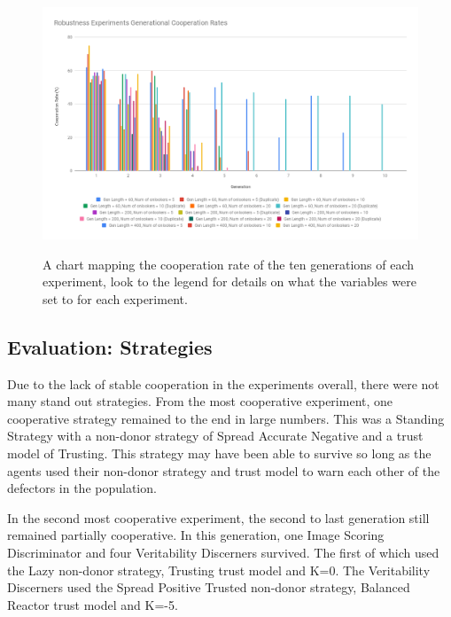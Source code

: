 \documentclass[]{final_report}
\begin{document}
\begin{figure}
\begin{framed}
	\includegraphics[width=\textwidth]{robustness_experiment1_chart.png}
	\label{fig:robustness_experiment_chart}
	\caption{A chart mapping the cooperation rate of the ten generations of each experiment, look to the legend for details on what the variables were set to for each experiment.}
\end{framed}
\end{figure}

\subsection{Evaluation: Strategies}
\label{subs:eval_strats}
Due to the lack of stable cooperation in the experiments overall, there were not many stand out strategies. From the most cooperative experiment, one cooperative strategy remained to the end in large numbers. This was a Standing Strategy with a non-donor strategy of Spread Accurate Negative and a trust model of Trusting. This strategy may have been able to survive so long as the agents used their non-donor strategy and trust model to warn each other of the defectors in the population.\par 
In the second most cooperative experiment, the second to last generation still remained partially cooperative. In this generation, one Image Scoring Discriminator and four Veritability Discerners survived. The first of which used the Lazy non-donor strategy, Trusting trust model and K=0. The Veritability Discerners used the Spread Positive Trusted non-donor strategy, Balanced Reactor trust model and K=-5.
\end{document}
